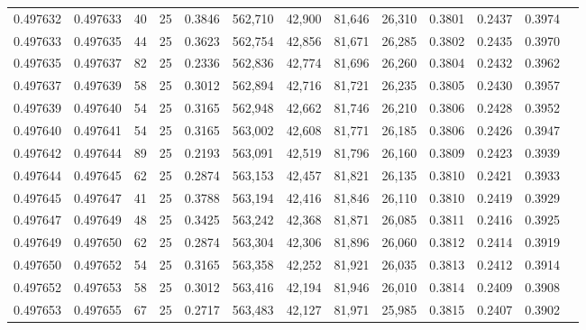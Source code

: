 \begin{tabular}{rrrrrrrrrrrrr}
0.497632 & 0.497633 &    40 &  25 &                                     0.3846 & 562,710 &  42,900 &  81,646 &  26,310 & 0.3801 & 0.2437 & 0.3974 \\
0.497633 & 0.497635 &    44 &  25 &                                     0.3623 & 562,754 &  42,856 &  81,671 &  26,285 & 0.3802 & 0.2435 & 0.3970 \\
0.497635 & 0.497637 &    82 &  25 &                                     0.2336 & 562,836 &  42,774 &  81,696 &  26,260 & 0.3804 & 0.2432 & 0.3962 \\
0.497637 & 0.497639 &    58 &  25 &                                     0.3012 & 562,894 &  42,716 &  81,721 &  26,235 & 0.3805 & 0.2430 & 0.3957 \\
0.497639 & 0.497640 &    54 &  25 &                                     0.3165 & 562,948 &  42,662 &  81,746 &  26,210 & 0.3806 & 0.2428 & 0.3952 \\
0.497640 & 0.497641 &    54 &  25 &                                     0.3165 & 563,002 &  42,608 &  81,771 &  26,185 & 0.3806 & 0.2426 & 0.3947 \\
0.497642 & 0.497644 &    89 &  25 &                                     0.2193 & 563,091 &  42,519 &  81,796 &  26,160 & 0.3809 & 0.2423 & 0.3939 \\
0.497644 & 0.497645 &    62 &  25 &                                     0.2874 & 563,153 &  42,457 &  81,821 &  26,135 & 0.3810 & 0.2421 & 0.3933 \\
0.497645 & 0.497647 &    41 &  25 &                                     0.3788 & 563,194 &  42,416 &  81,846 &  26,110 & 0.3810 & 0.2419 & 0.3929 \\
0.497647 & 0.497649 &    48 &  25 &                                     0.3425 & 563,242 &  42,368 &  81,871 &  26,085 & 0.3811 & 0.2416 & 0.3925 \\
0.497649 & 0.497650 &    62 &  25 &                                     0.2874 & 563,304 &  42,306 &  81,896 &  26,060 & 0.3812 & 0.2414 & 0.3919 \\
0.497650 & 0.497652 &    54 &  25 &                                     0.3165 & 563,358 &  42,252 &  81,921 &  26,035 & 0.3813 & 0.2412 & 0.3914 \\
0.497652 & 0.497653 &    58 &  25 &                                     0.3012 & 563,416 &  42,194 &  81,946 &  26,010 & 0.3814 & 0.2409 & 0.3908 \\
0.497653 & 0.497655 &    67 &  25 &                                     0.2717 & 563,483 &  42,127 &  81,971 &  25,985 & 0.3815 & 0.2407 & 0.3902 \\

\end{tabular}
